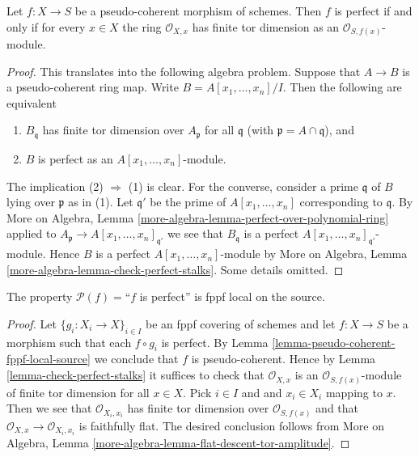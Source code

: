 \begin{lemma}
\label{lemma-check-perfect-stalks}
Let $f : X \to S$ be a pseudo-coherent morphism of schemes.
Then $f$ is perfect if and only if for every $x \in X$ the
ring $\mathcal{O}_{X, x}$ has finite tor dimension as an
$\mathcal{O}_{S, f(x)}$-module.
\end{lemma}

\begin{proof}
This translates into the following algebra problem.
Suppose that $A \to B$ is a pseudo-coherent ring map.
Write $B = A[x_1, \ldots, x_n]/I$. Then the following are
equivalent
\begin{enumerate}
\item $B_{\mathfrak q}$ has finite tor dimension over $A_{\mathfrak p}$ for
all $\mathfrak q$ (with $\mathfrak p = A \cap \mathfrak q$), and
\item $B$ is perfect as an $A[x_1, \ldots, x_n]$-module.
\end{enumerate}
The implication (2) $\Rightarrow$ (1) is clear. For the converse, consider
a prime $\mathfrak q$ of $B$ lying over $\mathfrak p$ as in (1). Let
$\mathfrak q'$ be the prime of $A[x_1, \ldots, x_n]$ corresponding to
$\mathfrak q$. By
More on Algebra, Lemma \ref{more-algebra-lemma-perfect-over-polynomial-ring}
applied to $A_{\mathfrak p} \to A[x_1, \ldots, x_n]_{\mathfrak q'}$
we see that $B_{\mathfrak q}$ is a perfect
$A[x_1, \ldots, x_n]_{\mathfrak q'}$-module. Hence
$B$ is a perfect $A[x_1, \ldots, x_n]$-module by
More on Algebra, Lemma \ref{more-algebra-lemma-check-perfect-stalks}.
Some details omitted.
\end{proof}

\begin{lemma}
\label{lemma-perfect-fppf-local-source}
The property $\mathcal{P}(f) =$``$f$ is perfect''
is fppf local on the source.
\end{lemma}

\begin{proof}
Let $\{g_i : X_i \to X\}_{i \in I}$ be an fppf covering of schemes and let
$f : X \to S$ be a morphism such that each $f \circ g_i$ is
perfect. By
Lemma \ref{lemma-pseudo-coherent-fppf-local-source}
we conclude that $f$ is pseudo-coherent.
Hence by
Lemma \ref{lemma-check-perfect-stalks}
it suffices to check that $\mathcal{O}_{X, x}$ is an
$\mathcal{O}_{S, f(x)}$-module of finite tor dimension for all $x \in X$.
Pick $i \in I$ and and $x_i \in X_i$ mapping to $x$. Then we see that
$\mathcal{O}_{X_i, x_i}$ has finite tor dimension over
$\mathcal{O}_{S, f(x)}$ and that
$\mathcal{O}_{X, x} \to \mathcal{O}_{X_i, x_i}$ is faithfully flat.
The desired conclusion follows from
More on Algebra, Lemma \ref{more-algebra-lemma-flat-descent-tor-amplitude}.
\end{proof}









